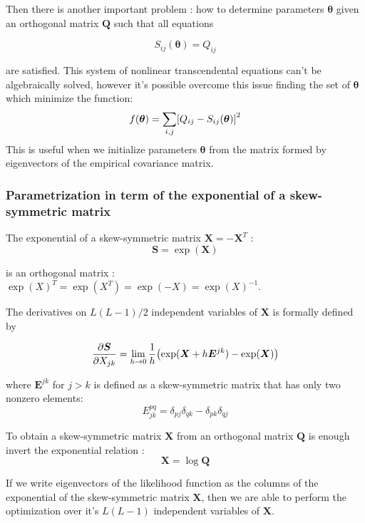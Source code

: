 \documentclass[preprint,amsmath,amssymb,superscriptaddress,showpacs,pre]{revtex4-1}
\let\originalleft\left
\let\originalright\right
\renewcommand{\left}{\mathopen{}\mathclose\bgroup\originalleft}
\renewcommand{\right}{\aftergroup\egroup\originalright}
\begin{document}
Then there is another  important problem : how to determine parameters $\bm \theta$  given an orthogonal matrix $\bm Q$ such that all equations 

$$S_{ij}(\bm \theta)=Q_{ij}$$

are satisfied. This system of nonlinear transcendental equations  can't be algebraically solved, however it's possible overcome  this issue finding the set of $\bm \theta$ which minimize the function:   
\begin{equation}
f(\bm \theta)=\sum_{i,j}\left[ Q_{ij}-S_{ij}(\bm \theta)\right] ^2
\end{equation}
This is useful when we initialize parameters $\bm \theta$  from the matrix formed by eigenvectors of the empirical covariance matrix.
\subsubsection{Parametrization in term of the exponential of a skew-symmetric matrix }
The exponential of a skew-symmetric matrix $\bm X=-\bm X^T$  : 
 \begin{equation}
 \bm S=\exp (\bm X)
 \end{equation}
 
 is  an  orthogonal  matrix : $\exp(X)^T=\exp(X^T)=\exp(-X)=\exp(X)^{-1}$. 
 
 The derivatives on $L(L-1)/2$ independent variables of $\bm X$  is formally defined by
 
 \begin{equation}
 \frac{\partial \bm S}{\partial X_{jk}}=\lim_{h\rightarrow 0} \frac{1}{h} \left( \exp(\bm X+ h \bm E^{jk}) - \exp(\bm X)\right) 
 \end{equation}
 
 where $\bm E^{jk}$ for $j > k$ is defined as a skew-symmetric matrix that has only two nonzero elements:
 \begin{equation}
 E^{pq}_{jk}=\delta_{pj}\delta_{qk}-\delta_{pk}\delta_{qj}
 \end{equation}
 
To obtain   a skew-symmetric matrix    $\bm X$ from an orthogonal matrix $\bm Q$    is enough invert the exponential relation :
 $$\bm X=\log \bm Q$$
 
  If we write eigenvectors of the likelihood function as the columns of the exponential of the skew-symmetric matrix $\bm X$, then we are able to perform the optimization over it's $L(L-1)$ independent variables of $\bm X$.
 
\end{document}

